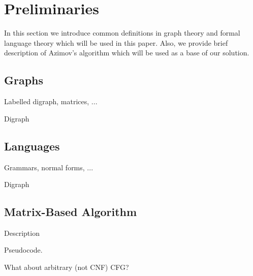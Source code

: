 \section{Preliminaries}

In this section we introduce common definitions in graph theory and formal language theory which will be used in this paper. 
Also, we provide brief description of Azimov's algorithm which will be used as a base of our solution.

\subsection{Graphs}

Labelled digraph, matrices, ...
\begin{definition}
Digraph
\end{definition}

\subsection{Languages}

Grammars, normal forms, ...
\begin{definition}
Digraph
\end{definition}


\subsection{Matrix-Based Algorithm}

Description

Pseudocode.

What about arbitrary (not CNF) CFG? 